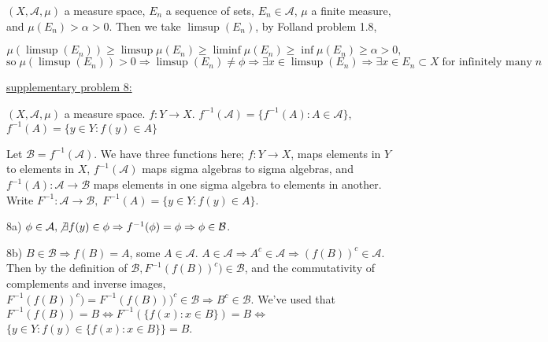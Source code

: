 \documentclass[12pt]{article}
\begin{document}
\begin{flushleft}
$(X,\mathcal{A},\mu)$ a measure space, $E_n$ a sequence of sets, $E_n \in \mathcal{A}$, $\mu$ a finite measure, and $\mu(E_n)>\alpha>0$. Then we take $\limsup(E_n)$, by Folland problem 1.8, 
\end{flushleft}

\vspace{-0.2in}

\begin{equation*} 
\mu(\limsup(E_n)) \ge \limsup \mu(E_n) \ge \liminf \mu(E_n) \ge \inf \mu(E_n) \ge \alpha > 0,
\end{equation*}
\begin{equation*} 
\textrm{so} \;  \mu(\limsup(E_n)) > 0 \Rightarrow \limsup(E_n) \not = \phi \Rightarrow \exists x \in \limsup(E_n) \Rightarrow \exists x \in E_n \subset X \; \textrm{for infinitely many} \; n
\end{equation*}











\begin{flushleft}
\underline{supplementary problem 8:}
\end{flushleft}

\begin{flushleft}
$(X,\mathcal{A},\mu)$ a measure space. $f: Y \rightarrow X$. $f^{-1}(\mathcal{A}) = \{ f^{-1}(A): A \in \mathcal{A}   \}$, $f^{-1}(A) = \{ y \in Y: f(y) \in A \}$
\end{flushleft}

\begin{flushleft}
Let $\mathcal{B} = f^{-1}(\mathcal{A})$. We have three functions here; $f: Y \rightarrow X$, maps elements in $Y$ to elements in $X$, $f^{-1}(\mathcal{A})$ maps sigma algebras to sigma algebras, and $f^{-1}(A): \mathcal{A} \rightarrow \mathcal{B}$ maps elements in one sigma algebra to elements in another. Write $F^{-1}: \mathcal{A} \rightarrow \mathcal{B}, \; F^{-1}(A) = \{ y \in Y : f(y) \in A \}$.
\end{flushleft}

\begin{flushleft}
8a) $\phi \in \mathcal{A}, \not \exists f(y) \in \phi \Rightarrow f^{-1}(\phi) = \phi \Rightarrow \phi \in \mathcal{B}$.
\end{flushleft}

\begin{flushleft}
8b) $B \in \mathcal{B} \Rightarrow f(B) = A$, some $A \in \mathcal{A}$. $A \in \mathcal{A} \Rightarrow A^c \in \mathcal{A} \Rightarrow (f(B))^c \in \mathcal{A}$. Then by the definition of $\mathcal{B}, F^{-1}(f(B))^c) \in \mathcal{B}$, and the commutativity of complements and inverse images, $F^{-1}(f(B))^c) = F^{-1}(f(B)))^c \in \mathcal{B} \Rightarrow B^c \in \mathcal{B}.$ We've used that $F^{-1}(f(B)) = B  \Leftrightarrow F^{-1}( \{ f(x): x \in B \} ) = B \Leftrightarrow$
$  \{ y \in Y : f(y) \in \{ f(x): x \in B \} \} = B$.
\end{flushleft}
\end{document}
